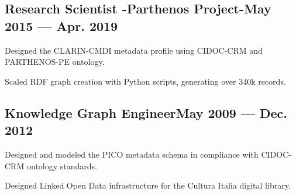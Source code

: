 \documentclass[letter,10pt]{article}
\begin{document}
\subsection{{Research Scientist -Parthenos Project-\hfill May 2015 --- Apr. 2019}}
\begin{zitemize}
\item Designed the CLARIN-CMDI metadata profile using CIDOC-CRM and PARTHENOS-PE ontology.
\item Scaled RDF graph creation with Python scripts, generating over 340k records.
\end{zitemize}

\subsection{{Knowledge Graph Engineer\hfill May 2009 --- Dec. 2012}}
\begin{zitemize}
\item Designed and modeled the PICO metadata schema in compliance with CIDOC-CRM ontology standards.
\item Designed Linked Open Data infrastructure for the Cultura Italia digital library.
\end{zitemize}

\end{document}
